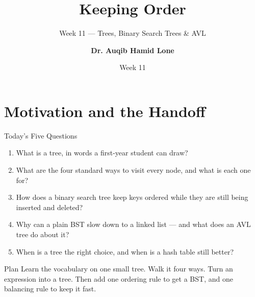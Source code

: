 \documentclass[aspectratio=169]{beamer}
\title{Keeping Order}
\subtitle{Week 11 --- Trees, Binary Search Trees \& AVL}
\author[Dr. Auqib Hamid Lone]{\textbf{Dr. Auqib Hamid Lone}}
\institute[GCET Ganderbal]{PCC CS-301: Data Structures\\GCET, Ganderbal}
\date[Week 11]{\small Week 11}
\begin{document}
\frame{\titlepage}

\section{Motivation and the Handoff}

\begin{frame}{Today's Five Questions}
  \begin{enumerate}
    \item What is a tree, in words a first-year student can draw?
    \item What are the four standard ways to visit every node, and what is
      each one for?
    \item How does a binary search tree keep keys ordered while they are
      still being inserted and deleted?
    \item Why can a plain BST slow down to a linked list --- and what does an
      AVL tree do about it?
    \item When is a tree the right choice, and when is a hash table still
      better?
  \end{enumerate}
  \vspace{0.15cm}
  \begin{exampleblock}{Plan}
    Learn the vocabulary on one small tree. Walk it four ways. Turn an
    expression into a tree. Then add one ordering rule to get a BST, and one
    balancing rule to keep it fast.
  \end{exampleblock}
\end{frame}
\end{document}

